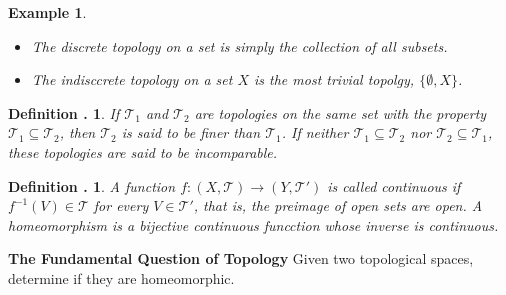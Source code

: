 \documentclass[twoside]{report}
\newcommand{\cleanbr}{\vspace{1em}\noindent}
\newcounter{Lecture}
\theoremstyle{myts}
\newcounter{c}[Lecture]
\newtheorem{dfn}[c]{Definition \arabic{Lecture}.}
\newtheorem*{epl}{Example}
\begin{document}
\begin{epl}
  \cleanbr
  \begin{itemize}
    \item The \emph{discrete topology} on a set is simply the collection of all subsets.
    \item The \emph{indisccrete topology} on a set $X$ is the most trivial topolgy, \(\{\emptyset, X\}\).
  \end{itemize}
\end{epl}

\begin{dfn}
  If \(\mathcal{T}_1\) and \(\mathcal{T}_2\) are topologies on the same set with the property \( \mathcal{T}_1 \subseteq \mathcal{T}_2 \), then \(\mathcal{T}_2\) is said to be \emph{finer} than \(\mathcal{T}_1\). If neither \( \mathcal{T}_1 \subseteq \mathcal{T}_2 \) nor \( \mathcal{T}_2 \subseteq \mathcal{T}_1 \), these topologies are said to be \emph{incomparable}.
\end{dfn}

\begin{dfn}
  A function \( f : (X,\mathcal{T}) \to (Y,\mathcal{T}') \) is called \emph{continuous} if \(f^{-1}(V) \in \mathcal{T}\) for every \(V\in\mathcal{T}'\), that is, the preimage of open sets are open. A \emph{homeomorphism} is a bijective continuous funcction whose inverse is continuous.
\end{dfn}

\cleanbr
{\bf The Fundamental Question of Topology}  Given two topological spaces, determine if they are homeomorphic.
\end{document}
